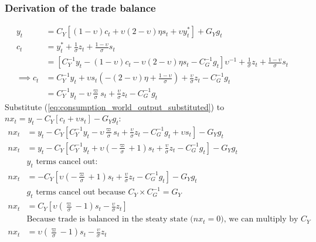 \subsubsection*{Derivation of the trade balance}
\begin{align}\label{eq:appendix_trade_balance_derivation_beginning}
    y_t &= C_Y\left[(1-\upsilon)c_t + \upsilon (2-\upsilon)\eta s_t + \upsilon y^*_t\right] + G_Y g_t\\
    c_t &= y_t^* + \frac{1}{\sigma}z_t + \frac{1-\upsilon}{\sigma}s_t\\
    &= \left[C_Y^{-1} y_t -(1-\upsilon)c_t - \upsilon(2-\upsilon)\eta s_t - C^{-1}_G g_t \right]\upsilon^{-1} + \frac{1}{\sigma}z_t + \frac{1-\upsilon}{\sigma}s_t\\
    \implies c_t &= C_Y^{-1} y_t + \upsilon s_t \left( -(2-\upsilon)\eta + \frac{1-\upsilon}{\sigma}\right) + \frac{\upsilon}{\sigma}z_t - C_G^{-1} g_t \\
     &= C_Y^{-1} y_t - \upsilon \frac{\varpi}{\sigma} s_t + \frac{\upsilon}{\sigma}z_t - C_G^{-1} g_t \label{eq:consumption_world_output_substituted}
\end{align}
Substitute (\ref{eq:consumption_world_output_substituted}) to $nx_t=y_t - C_Y[c_t + \upsilon s_t] - G_Y g_t$:
\begin{align}
    nx_t&=y_t - C_Y\left[C_Y^{-1} y_t - \upsilon \frac{\varpi}{\sigma} s_t + \frac{\upsilon}{\sigma}z_t - C_G^{-1} g_t + \upsilon s_t \right] - G_Y g_t \\
    nx_t&=y_t - C_Y\left[C_Y^{-1} y_t + \upsilon \left(-\frac{\varpi}{\sigma} + 1\right) s_t + \frac{\upsilon}{\sigma}z_t - C_G^{-1} g_t \right] - G_Y g_t \\
    &\text{$y_t$ terms cancel out:} \nonumber\\
    nx_t&=-C_Y\left[\upsilon \left(-\frac{\varpi}{\sigma} + 1\right) s_t + \frac{\upsilon}{\sigma}z_t - C_G^{-1} g_t \right] - G_Y g_t \\
    &\text{$g_t$ terms cancel out because $C_Y\times C_G^{-1} = G_Y$} \nonumber\\
    nx_t&=C_Y\left[\upsilon \left(\frac{\varpi}{\sigma} - 1\right) s_t - \frac{\upsilon}{\sigma}z_t \right]\\
    &\text{Because trade is balanced in the steaty state ($nx_t = 0$), we can multiply by $C_Y$} \nonumber \\
    nx_t&=\upsilon \left(\frac{\varpi}{\sigma} - 1\right) s_t - \frac{\upsilon}{\sigma}z_t \label{eq:appendix_trade_balance_derivation_end}
\end{align}
\newpage